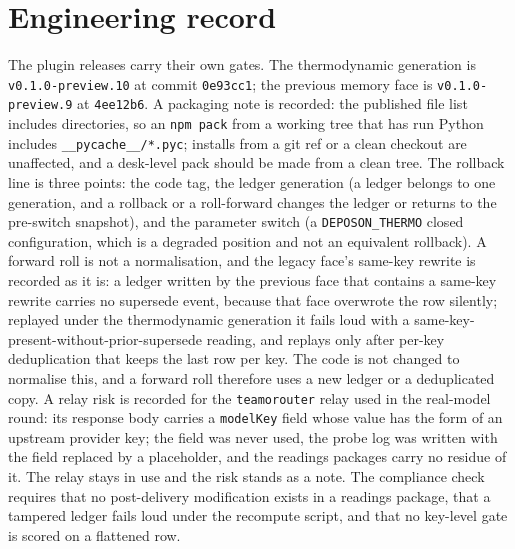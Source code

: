 \documentclass[11pt,a4paper]{article}
\begin{document}
\section{Engineering record}
\label{app:engineering}
The plugin releases carry their own gates. The thermodynamic generation is \texttt{v0.1.0-preview.10} at commit \texttt{0e93cc1}; the previous memory face is \texttt{v0.1.0-preview.9} at \texttt{4ee12b6}. A packaging note is recorded: the published file list includes directories, so an \texttt{npm pack} from a working tree that has run Python includes \texttt{\_\_pycache\_\_/*.pyc}; installs from a git ref or a clean checkout are unaffected, and a desk-level pack should be made from a clean tree. The rollback line is three points: the code tag, the ledger generation (a ledger belongs to one generation, and a rollback or a roll-forward changes the ledger or returns to the pre-switch snapshot), and the parameter switch (a \texttt{DEPOSON\_THERMO} closed configuration, which is a degraded position and not an equivalent rollback). A forward roll is not a normalisation, and the legacy face's same-key rewrite is recorded as it is: a ledger written by the previous face that contains a same-key rewrite carries no supersede event, because that face overwrote the row silently; replayed under the thermodynamic generation it fails loud with a same-key-present-without-prior-supersede reading, and replays only after per-key deduplication that keeps the last row per key. The code is not changed to normalise this, and a forward roll therefore uses a new ledger or a deduplicated copy. A relay risk is recorded for the \texttt{teamorouter} relay used in the real-model round: its response body carries a \texttt{modelKey} field whose value has the form of an upstream provider key; the field was never used, the probe log was written with the field replaced by a placeholder, and the readings packages carry no residue of it. The relay stays in use and the risk stands as a note. The compliance check requires that no post-delivery modification exists in a readings package, that a tampered ledger fails loud under the recompute script, and that no key-level gate is scored on a flattened row.




\end{document}
